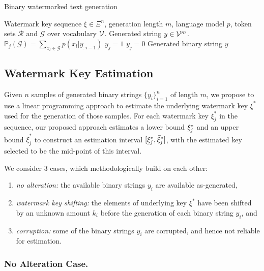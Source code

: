 \begin{algorithm}[t]
%
\caption{Binary watermarked text generation}\label{alg:generate}
%
\begin{algorithmic}[1]
%
\renewcommand{\algorithmicrequire}{\textbf{Input:}}
\renewcommand{\algorithmicensure}{\textbf{Output:}}
%
\REQUIRE Watermark key sequence $\xi \in \Xi^{n}$, generation length $m$, language model $p$, token sets $\mathcal{R}$ and $\mathcal{G}$ over vocabulary $\mathcal{V}$.
\ENSURE Generated string $y \in \mathcal{V}^m$.
%
%
\STATE $\mathbb{P}_j(\mathcal{G}) = \sum_{x_l \in \mathcal{G}} p(x_l | y_{: i-1})$
%
\STATE $y_j = 1$
\ELSE
\STATE $y_j=0$
\ENDIF
\ENDFOR
%
\RETURN Generated binary string $y$
\end{algorithmic}
\end{algorithm}


\subsection{Watermark Key Estimation}

Given $n$ samples of generated binary strings $\{y_i\}_{i=1}^n$ of length $m$, we propose to use a linear programming approach to estimate the underlying watermark key $\xi^*$ used for the generation of those samples. For each watermark key $\xi^*_j$ in the sequence, our proposed approach estimates a lower bound $\ubar{\xi}^*_j$ and an upper bound $\bar{\xi}^*_j$ to construct an estimation interval $[\ubar{\xi}^*_j, \bar{\xi}^*_j]$, with the estimated key selected to be the mid-point of this interval.


We consider 3 cases, which methodologically build on each other:
\begin{enumerate}
    \item \textit{no alteration:} the available binary strings $y_i$ are available as-generated,
    \item \textit{watermark key shifting:} the elements of underlying key $\xi^*$ have been shifted by an unknown amount $k_i$ before the generation of each binary string $y_i$, and
    \item \textit{corruption:} some of the binary strings $y_i$ are corrupted, and hence not reliable for estimation.
\end{enumerate}


\subsubsection{No Alteration Case.}

